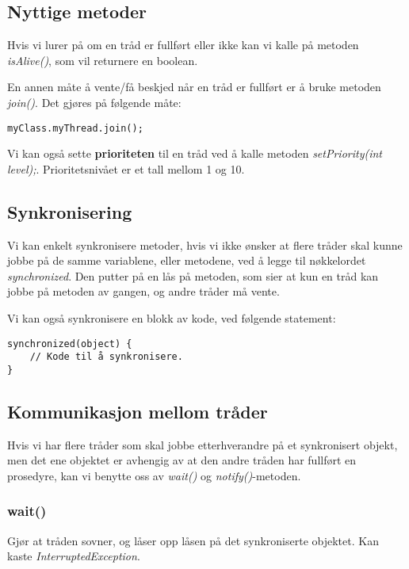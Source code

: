 \documentclass[11pt]{article}
\begin{document}
\subsection{Nyttige metoder}
\label{sec-18-2}


Hvis vi lurer på om en tråd er fullført eller ikke kan vi kalle på
metoden \emph{isAlive()}, som vil returnere en boolean.

En annen måte å vente/få beskjed når en tråd er fullført er å bruke
metoden \emph{join()}. Det gjøres på følgende måte:


\begin{verbatim}
myClass.myThread.join();
\end{verbatim}

Vi kan også sette \textbf{prioriteten} til en tråd ved å kalle metoden
\emph{setPriority(int level);}. Prioritetsnivået er et tall mellom 1
og 10. 
\subsection{Synkronisering}
\label{sec-18-3}


Vi kan enkelt synkronisere metoder, hvis vi ikke ønsker at flere
tråder skal kunne jobbe på de samme variablene, eller metodene, ved å
legge til nøkkelordet \emph{synchronized}. Den putter på en lås på metoden,
som sier at kun en tråd kan jobbe på metoden av gangen, og andre
tråder må vente.

Vi kan også synkronisere en blokk av kode, ved følgende statement:


\begin{verbatim}
synchronized(object) { 
    // Kode til å synkronisere.
}
\end{verbatim}
\subsection{Kommunikasjon mellom tråder}
\label{sec-18-4}


Hvis vi har flere tråder som skal jobbe etterhverandre på et
synkronisert objekt, men det ene objektet er avhengig av at den andre
tråden har fullført en prosedyre, kan vi benytte oss av \emph{wait()} og
\emph{notify()}-metoden. 
\subsubsection{wait()}
\label{sec-18-4-1}


Gjør at tråden sovner, og låser opp låsen på det synkroniserte
objektet. Kan kaste \emph{InterruptedException}.
\end{document}
